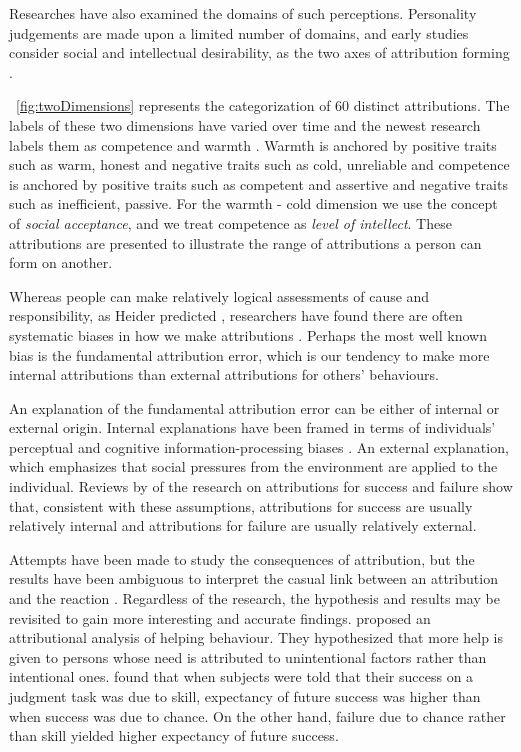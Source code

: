 Researches have also examined the domains of such perceptions.  Personality judgements are made upon a limited number of domains,  and early studies consider social and intellectual desirability, as the two axes of attribution forming \cite{Rosenberg1968}.

~\autoref{fig:twoDimensions} represents the categorization of 60 distinct attributions.  The labels of these two dimensions have varied over time and the newest research labels them as competence and warmth \cite{Fiske2007, Judd2005}. Warmth is anchored by positive traits such as warm, honest and negative traits such as cold, unreliable and competence is anchored by positive traits such as competent and assertive and negative traits such as inefficient, passive.  For the warmth - cold dimension we use the concept of \textit{social acceptance}, and we treat competence as \textit{level of intellect}. These attributions are presented to illustrate the range of attributions a person can form on another.

Whereas people can make relatively logical assessments of cause and responsibility, as Heider predicted \cite{Heider1958}, researchers have found there are often systematic biases in how we make attributions \cite{Ross1977}. Perhaps the most well known bias is the fundamental attribution error, which is our tendency to make more internal attributions than external attributions for others' behaviours. 

An explanation of the fundamental attribution error can be either of internal or external origin.  Internal explanations have been framed in terms of individuals' perceptual and cognitive information-processing biases \cite{Kelley1980}. An external explanation, which emphasizes that social pressures from the environment are applied to the individual.  Reviews by \cite{Zuckerman1979} of the research on
attributions for success and failure show that, consistent with these assumptions, attributions for success are usually relatively internal and attributions
for failure are usually relatively external. 

Attempts have been made to study the consequences of attribution,  but the results have been ambiguous to interpret the casual link between an attribution and the reaction \cite{Kelley1980}.  Regardless of the research, the hypothesis and results may be revisited to gain more interesting and accurate findings.  \cite{Ickes1976} proposed an attributional analysis of helping behaviour. They hypothesized that more help is given to persons whose need is attributed to unintentional factors rather than intentional ones. \cite{Phares1957} found that when subjects were told that their success on a
judgment task was due to skill, expectancy of future success was higher than
when success was due to chance. On the other hand, failure due to chance
rather than skill yielded higher expectancy of future success.  

